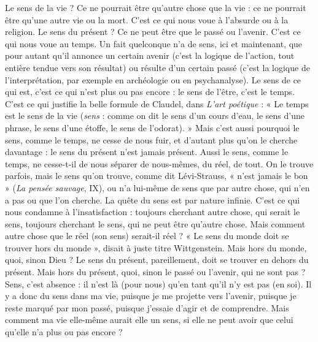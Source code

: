 Le sens de la vie ? Ce ne pourrait être qu'autre chose que la vie : ce ne pourrait
être qu’une autre vie ou la mort. C’est ce qui nous voue à l’absurde ou à la
religion. Le sens du présent ? Ce ne peut être que le passé ou l'avenir. C’est ce
qui nous voue au temps. Un fait quelconque n’a de sens, ici et maintenant, que
pour autant qu’il annonce un certain avenir (c’est la logique de l’action, tout
entière tendue vers son résultat) ou résulte d’un certain passé (c’est la logique
de l'interprétation, par exemple en archéologie ou en psychanalyse). Le sens de
ce qui est, c’est ce qui n’est plus ou pas encore : le sens de l'être, c’est le temps.
C’est ce qui justifie la belle formule de Claudel, dans {\it L'art poétique} : « Le temps
est le sens de la vie ({\it sens} : comme on dit le sens d’un cours d’eau, le sens d’une
phrase, le sens d’une étoffe, le sens de l’odorat). » Mais c’est aussi pourquoi le
sens, comme le temps, ne cesse de nous fuir, et d’autant plus qu’on le cherche
davantage : le sens du présent n’est jamais présent. Aussi le sens, comme le
temps, ne cesse-t-il de nous séparer de nous-mêmes, du réel, de tout. On le
trouve parfois, mais le sens qu’on trouve, comme dit Lévi-Strauss, « n’est
jamais le bon » ({\it La pensée sauvage}, IX), ou n’a lui-même de sens que par autre
chose, qui n’en a pas ou que l’on cherche. La quête du sens est par nature
infinie. C’est ce qui nous condamne à l’insatisfaction : toujours cherchant autre
chose, qui serait le sens, toujours cherchant le sens, qui ne peut être qu'autre
chose. Mais comment autre chose que le réel (son sens) serait-il réel ? « Le sens
du monde doit se trouver hors du monde », disait à juste titre Wittgenstein.
Mais hors du monde, quoi, sinon Dieu ? Le sens du présent, pareillement, doit
se trouver en dehors du présent. Mais hors du présent, quoi, sinon le passé ou
l'avenir, qui ne sont pas ? Sens, c’est absence : il n’est là (pour nous) qu'en tant
qu’il n’y est pas (en soi). Il y a donc du sens dans ma vie, puisque je me projette
vers l'avenir, puisque je reste marqué par mon passé, puisque j'essaie d'agir et
de comprendre. Mais comment ma vie elle-même aurait elle un sens, si elle ne
peut avoir que celui qu’elle n’a plus ou pas encore ?

